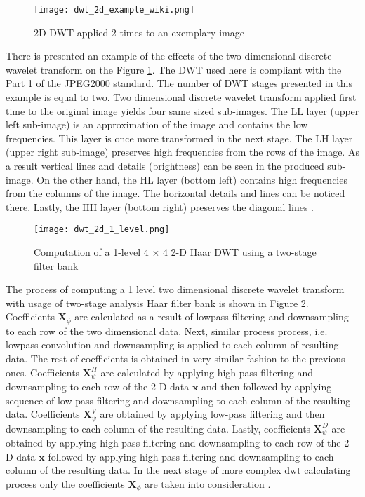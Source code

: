 \begin{figure}
    \centering
    \texttt{[image: dwt\_2d\_example\_wiki.png]}
    \caption{2D DWT applied 2 times to an exemplary image \cite{dwt_example_wiki}}
    \label{fig:dwt_2d_example_wiki}
\end{figure}

There is presented an example of the effects of the two dimensional discrete wavelet transform on the Figure \ref{fig:dwt_2d_example_wiki}.
The DWT used here is compliant with the Part 1 of the JPEG2000 standard. The number of DWT stages presented in this  
example is equal to two. Two dimensional discrete wavelet transform applied first time to the original image
yields four same sized sub-images. The LL layer (upper left sub-image) is an approximation of the image and contains the low frequencies.
This layer is once more transformed in the next stage. The LH layer (upper right sub-image) preserves high frequencies from the rows of the image.
As a result vertical lines and details (brightness) can be seen in the produced sub-image. On the other hand, the HL layer (bottom left)
contains high frequencies from the columns of the image. The horizontal details and lines can be noticed there.
Lastly, the HH layer (bottom right) preserves the diagonal lines \cite{dwt_example_wiki}.

\begin{figure}
    \centering
    \texttt{[image: dwt\_2d\_1\_level.png]}
    \caption{Computation of a 1-level 4 $\times$ 4 2-D Haar DWT using a two-stage filter bank \cite{dwt_impl}}
    \label{fig:dwt_2d_1_level}
\end{figure}

The process of computing a 1 level two dimensional discrete wavelet transform with usage of
two-stage analysis Haar filter bank is shown in Figure \ref{fig:dwt_2d_1_level}. Coefficients $\mathbf{X}_{\phi}$
are calculated as a result of lowpass filtering and downsampling to each row of the two dimensional
data. Next, similar process process, i.e. lowpass convolution and downsampling is applied to each column of
resulting data. The rest of coefficients is obtained in very similar fashion to the previous ones.
Coefficients $\mathbf{X}^{H}_{\psi}$ are calculated by applying high-pass filtering and downsampling to each row of the
2-D data $\mathbf{x}$ and then followed by applying sequence of low-pass filtering and downsampling to each
column of the resulting data. Coefficients $\mathbf{X}^{V}_{\psi}$ are obtained by applying low-pass filtering
and then downsampling to each column of the resulting data. Lastly, coefficients $\mathbf{X}^{D}_{\psi}$ are
obtained by applying high-pass filtering and downsampling to each row of the 2-D data $\mathbf{x}$ followed by
applying high-pass filtering and downsampling to each column of the resulting data. In the next stage of more
complex dwt calculating process only the coefficients $\mathbf{X}_{\phi}$ are taken into consideration \cite{dwt_impl}.


